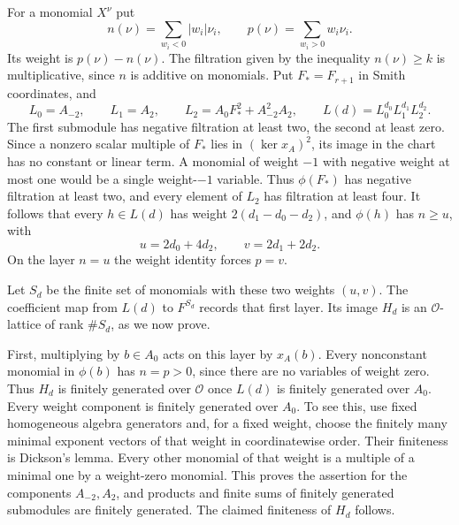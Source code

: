For a monomial \(X^\nu\) put
\[
 n(\nu)=\sum_{w_i<0}|w_i|\nu_i,\qquad
 p(\nu)=\sum_{w_i>0}w_i\nu_i .
\]
Its weight is \(p(\nu)-n(\nu)\). The filtration given by the
inequality \(n(\nu)\ge k\) is multiplicative, since \(n\) is
additive on monomials. Put \(F_*=F_{r+1}\) in Smith coordinates, and
\[
 L_0=A_{-2},\qquad L_1=A_2,\qquad
 L_2=A_0F_*^2+A_{-2}^2A_2,\qquad
 L(d)=L_0^{d_0}L_1^{d_1}L_2^{d_2}.
\]
The first submodule has negative filtration at least two, the second
at least zero. Since a nonzero scalar multiple of \(F_*\) lies in
\((\ker x_A)^2\), its image in the chart has no constant or linear
term. A monomial of weight \(-1\) with negative weight at most one
would be a single weight-\(-1\) variable. Thus \(\phi(F_*)\) has
negative filtration at least two, and every element of \(L_2\)
has filtration at least four. It follows that every
\(h\in L(d)\) has weight \(2(d_1-d_0-d_2)\), and
\(\phi(h)\) has \(n\ge u\), with
\[
                 u=2d_0+4d_2,\qquad v=2d_1+2d_2 .
\]
On the layer \(n=u\) the weight identity forces \(p=v\).

Let \(S_d\) be the finite set of monomials with these two weights
\((u,v)\). The coefficient map from \(L(d)\) to \(F^{S_d}\)
records that first layer. Its image \(H_d\) is an \(\mathcal O\)-lattice
of rank \(\#S_d\), as we now prove.

First, multiplying by \(b\in A_0\) acts on this layer by \(x_A(b)\).
Every nonconstant monomial in \(\phi(b)\) has \(n=p>0\), since
there are no variables of weight zero. Thus \(H_d\) is finitely
generated over \(\mathcal O\) once \(L(d)\) is finitely generated
over \(A_0\). Every weight component is finitely generated over
\(A_0\). To see this, use fixed homogeneous algebra generators and,
for a fixed weight, choose the finitely many minimal exponent
vectors of that weight in coordinatewise order. Their finiteness
is Dickson's lemma. Every other monomial of that weight is a multiple
of a minimal one by a weight-zero monomial. This proves the assertion
for the components \(A_{-2},A_2\), and products and finite sums of
finitely generated submodules are finitely generated. The claimed
finiteness of \(H_d\) follows.

